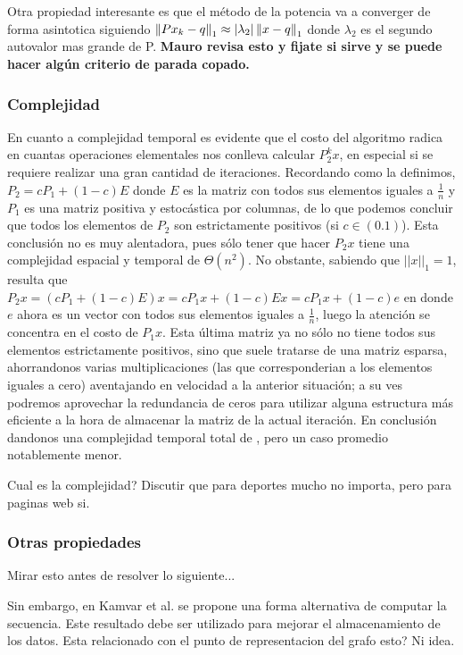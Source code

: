 Otra propiedad interesante es que el método de la potencia va a converger de forma asintotica siguiendo $\left\lVert Px_k - q\right\rVert_1 \approx |\lambda_2| \left\lVert x-q\right\rVert_1$ donde $\lambda_2$ es el segundo autovalor mas grande de P. \textbf{Mauro revisa esto y fijate si sirve y se puede hacer algún criterio de parada copado.}
\fi

\subsubsection{Complejidad}

En cuanto a complejidad temporal es evidente que el costo del algoritmo radica en cuantas operaciones elementales nos conlleva calcular $P_2^kx$, en especial si se requiere realizar una gran cantidad de iteraciones. Recordando como la definimos, $P_2 = cP_1 + (1-c)E$ donde $E$ es la matriz con todos sus elementos iguales a $\frac{1}{n}$ y $P_1$ es una matriz positiva y estocástica por columnas, de lo que podemos concluir que todos los elementos de $P_2$ son estrictamente positivos (si $c\in(0.1)$). Esta conclusión no es muy alentadora, pues sólo tener que hacer $P_2x$ tiene una complejidad espacial y temporal de $\Theta(n^2)$. No obstante, sabiendo que $||x||_1=1$, resulta que $P_2x = (cP_1 + (1-c)E)x = cP_1x + (1-c)Ex = cP_1x + (1-c)e$ en donde $e$ ahora es un vector con todos sus elementos iguales a $\frac{1}{n}$, luego la atención se concentra en el costo de $P_1x$. Esta última matriz ya no sólo no tiene todos sus elementos estrictamente positivos, sino que suele tratarse de una matriz esparsa, ahorrandonos varias multiplicaciones (las que corresponderian a los elementos iguales a cero) aventajando en velocidad a la anterior situación; a su ves podremos aprovechar la redundancia de ceros para utilizar alguna estructura más eficiente a la hora de almacenar la matriz de la actual iteración. En conclusión dandonos una complejidad temporal total de , pero un caso promedio notablemente menor.

\iffalse
Cual es la complejidad? Discutir que para deportes mucho no importa, pero para paginas web si.

\subsubsection{Otras propiedades}

Mirar esto antes de resolver lo siguiente...

Sin embargo, en Kamvar et al. se propone una forma alternativa de computar la secuencia. Este resultado debe ser utilizado para mejorar el almacenamiento de los datos. Esta relacionado con el punto de representacion del grafo esto? Ni idea.

